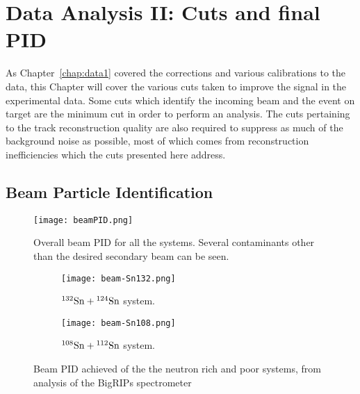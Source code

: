 \chapter{Data Analysis II: Cuts and final PID}
\label{chap:data2}

As Chapter~\ref{chap:data1} covered the corrections and various calibrations to the data, this Chapter will cover the various cuts taken to improve the signal in the experimental data. Some cuts which identify the incoming beam and the event on target are the minimum cut in order to perform an analysis. The cuts pertaining to the track reconstruction quality are also required to suppress as much of the background noise as possible, most of which comes from reconstruction inefficiencies which the cuts presented here address. 



\section{Beam Particle Identification}
\label{sec:beam}

\begin{figure}[!htb]
\centering
\texttt{[image: beamPID.png]}
\caption{Overall beam PID for all the systems. Several contaminants other than the desired secondary beam can be seen.}
\label{fig:beampid}
\end{figure}


\begin{figure}[!htb]

     \centering
     \begin{subfigure}[b]{0.49\textwidth}
         \centering
         \texttt{[image: beam-Sn132.png]}
         \caption{${}^{132}\mathrm{Sn} + {}^{124}\mathrm{Sn}$ system.}
         \label{fig:beampid132}
     \end{subfigure}
     \hfill
     \begin{subfigure}[b]{0.49\textwidth}
         \centering
         \texttt{[image: beam-Sn108.png]}
         \caption{${}^{108}\mathrm{Sn} + {}^{112}\mathrm{Sn}$ system.}
         \label{fig:beampid108}
     \end{subfigure}
        \caption{Beam PID achieved of the the neutron rich and poor systems, from analysis of the BigRIPs spectrometer \cite{jon} }
        \label{fig:beampidTwo}
\end{figure}


